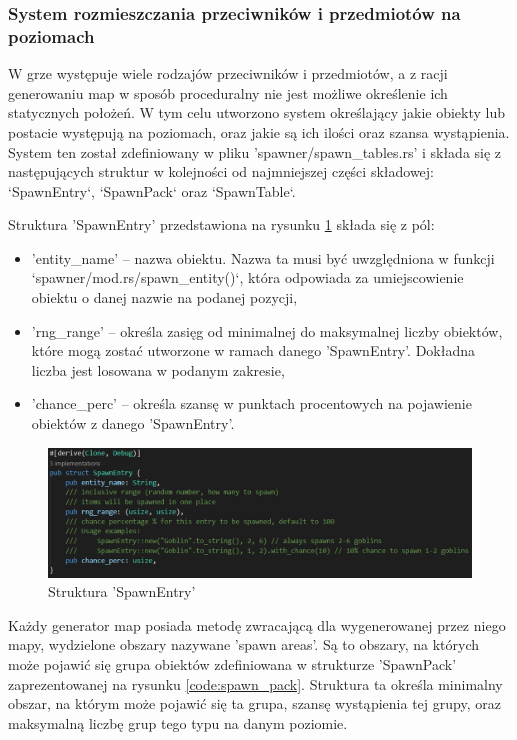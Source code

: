 \documentclass[12pt,twoside]{article}
\begin{document}
\subsubsection{System rozmieszczania przeciwników i przedmiotów na poziomach}
W grze występuje wiele rodzajów przeciwników i przedmiotów, a z racji generowaniu map w sposób proceduralny nie jest możliwe określenie ich statycznych położeń. W tym celu utworzono system określający jakie obiekty lub postacie występują na poziomach, oraz jakie są ich ilości oraz szansa wystąpienia. System ten został zdefiniowany w pliku 'spawner/spawn\_tables.rs' i składa się z następujących struktur w kolejności od najmniejszej części składowej: `SpawnEntry`, `SpawnPack` oraz `SpawnTable`.
 
Struktura 'SpawnEntry' przedstawiona na rysunku \ref{code:spawn_entry} składa się z pól:
\begin{itemize}
	\item 'entity\_name' -- nazwa obiektu. Nazwa ta musi być uwzględniona w funkcji `spawner/mod.rs/spawn\_entity()`, która odpowiada za umiejscowienie obiektu o danej nazwie na podanej pozycji,
	\item 'rng\_range' -- określa zasięg od minimalnej do maksymalnej liczby obiektów, które mogą zostać utworzone w ramach danego 'SpawnEntry'. Dokładna liczba jest losowana w podanym zakresie,
	\item 'chance\_perc' -- określa szansę w punktach procentowych na pojawienie obiektów z danego 'SpawnEntry'.	
\end{itemize}

 
\FloatBarrier
\begin{figure}[ht]
	\centering
	\includegraphics[width=16cm]{images/code/spawn_entry.png}
	\caption{Struktura 'SpawnEntry'}
	\label{code:spawn_entry}
\end{figure}
\FloatBarrier
 
Każdy generator map posiada metodę zwracającą dla wygenerowanej przez niego mapy, wydzielone obszary nazywane 'spawn areas'. Są to obszary, na których może pojawić się grupa obiektów zdefiniowana w strukturze 'SpawnPack' zaprezentowanej na rysunku \ref{code:spawn_pack}. Struktura ta określa minimalny obszar, na którym może pojawić się ta grupa, szansę wystąpienia tej grupy, oraz maksymalną liczbę grup tego typu na danym poziomie.
 
\end{document}
